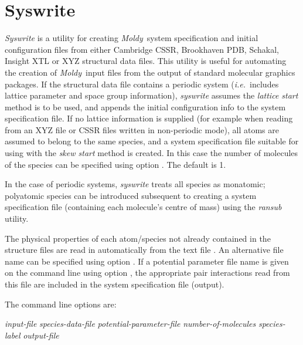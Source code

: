 \documentclass[a4paper,twoside]{report}
\newcommand{\moldy}{\emph{Moldy}}
\newcommand{\ie}{\emph{i.e.}}
\begin{document}
\section{Syswrite}%
\emph{Syswrite} is a utility for creating \moldy\ system specification
and initial configuration files from either Cambridge CSSR, Brookhaven
PDB, Schakal, Insight XTL or XYZ structural data files. This utility
is useful for automating the creation of \moldy\ input files from the output
of standard molecular graphics packages.
 If the structural data file contains a periodic system (\ie\, includes lattice parameter and space group information), 
\emph{syswrite} assumes the \emph{lattice start} method is to be used, and appends
the initial configuration info to the system specification file.
If no lattice information is supplied 
(for example when reading from an XYZ file or CSSR files written in non-periodic mode),
all atoms are assumed to belong to the same species, and a system specification file
suitable for using with the \emph{skew start} method is created. In this case the number
of molecules of the species can be specified using option . The default is 1.

In the case of periodic systems, \emph{syswrite} treats all species
as monatomic; polyatomic species can be introduced subsequent to
creating a system specification file (containing each molecule's centre of mass)
using the \emph{ransub} utility.

The physical properties of each atom/species not already contained in the
structure files are read in automatically from the text file
. An alternative
file name can be specified using option . If a potential
parameter file name is given on the command line using option
, the appropriate pair interactions read from this file are
included in the system specification file (output).

The command line options are:
\begin{center}
\Lit{[-i} \textit{input-file} \Lit{]}
\Lit{[-e} \textit{species-data-file}\Lit{]} 
\Lit{[-y} \textit{potential-parameter-file}\Lit{]} 
\Lit{[-n} \textit{number-of-molecules}\Lit{]}
\Lit{[-l} \textit{species-label}\Lit{]}
\Lit{[-o} \textit{output-file}\Lit{]}
\end{center}
\end{document}
